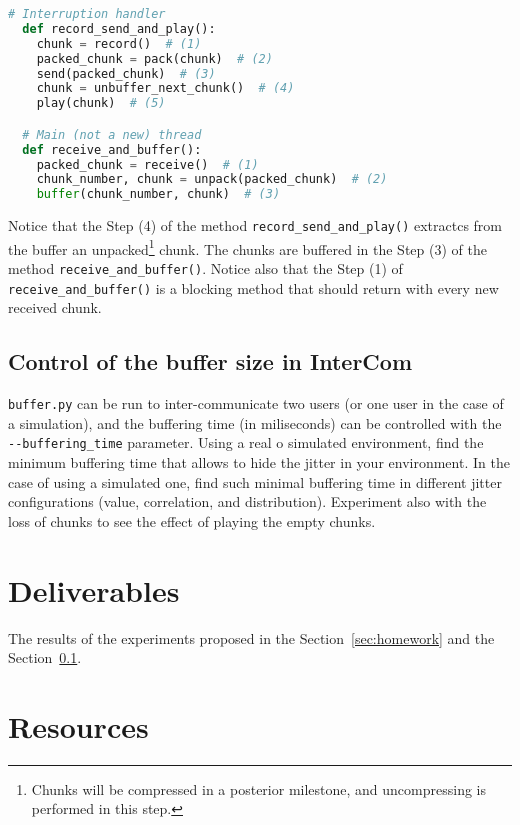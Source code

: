 \begin{lstlisting}[language=Python]
  # Interruption handler
  def record_send_and_play():
    chunk = record()  # (1)
    packed_chunk = pack(chunk)  # (2)
    send(packed_chunk)  # (3)
    chunk = unbuffer_next_chunk()  # (4)
    play(chunk)  # (5)

  # Main (not a new) thread
  def receive_and_buffer():
    packed_chunk = receive()  # (1)
    chunk_number, chunk = unpack(packed_chunk)  # (2)
    buffer(chunk_number, chunk)  # (3)
\end{lstlisting}

Notice that the Step (4) of the method \verb|record_send_and_play()|
extractcs from the buffer an unpacked\footnote{Chunks will be
compressed in a posterior milestone, and uncompressing is performed in
this step.} chunk. The chunks are buffered in the Step (3) of the
method \verb|receive_and_buffer()|. Notice also that the Step (1) of
\verb|receive_and_buffer()| is a blocking method that should return with
every new received chunk.


\subsection{Control of the buffer size in InterCom}
\label{sec:homework2}
\verb|buffer.py| can be run to inter-communicate two users (or one
user in the case of a simulation), and the buffering time (in
miliseconds) can be controlled with the \verb|--buffering_time|
parameter. Using a real o simulated environment, find the minimum
buffering time that allows to hide the jitter in your environment. In
the case of using a simulated one, find such minimal buffering time in
different jitter configurations (value, correlation, and
distribution). Experiment also with the loss of chunks to see the
effect of playing the empty chunks.

\section{Deliverables}

The results of the experiments proposed in the
Section~\ref{sec:homework} and the Section~\ref{sec:homework2}.

\section{Resources}


